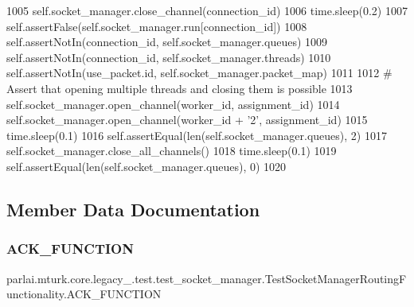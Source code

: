 \begin{DoxyCode}
1005         self.socket\_manager.close\_channel(connection\_id)
1006         time.sleep(0.2)
1007         self.assertFalse(self.socket\_manager.run[connection\_id])
1008         self.assertNotIn(connection\_id, self.socket\_manager.queues)
1009         self.assertNotIn(connection\_id, self.socket\_manager.threads)
1010         self.assertNotIn(use\_packet.id, self.socket\_manager.packet\_map)
1011 
1012         \textcolor{comment}{# Assert that opening multiple threads and closing them is possible}
1013         self.socket\_manager.open\_channel(worker\_id, assignment\_id)
1014         self.socket\_manager.open\_channel(worker\_id + \textcolor{stringliteral}{'2'}, assignment\_id)
1015         time.sleep(0.1)
1016         self.assertEqual(len(self.socket\_manager.queues), 2)
1017         self.socket\_manager.close\_all\_channels()
1018         time.sleep(0.1)
1019         self.assertEqual(len(self.socket\_manager.queues), 0)
1020 
\end{DoxyCode}


\subsection{Member Data Documentation}
\mbox{\label{classparlai_1_1mturk_1_1core_1_1legacy__2018_1_1test_1_1test__socket__manager_1_1TestSocketManagerRoutingFunctionality_aea74ab554867e33a3b3ebfe2961002db}} 
\subsubsection{\texorpdfstring{A\+C\+K\+\_\+\+F\+U\+N\+C\+T\+I\+ON}{ACK\_FUNCTION}}
{\footnotesize\ttfamily parlai.\+mturk.\+core.\+legacy\+\_.\+test.\+test\+\_\+socket\+\_\+manager.\+Test\+Socket\+Manager\+Routing\+Functionality.\+A\+C\+K\+\_\+\+F\+U\+N\+C\+T\+I\+ON\hspace{0.3cm}{\ttfamily [static]}}



